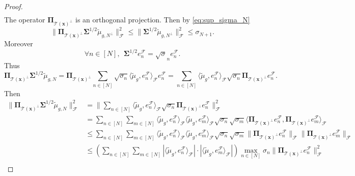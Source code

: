 \documentclass[twoside,11pt]{book}
\numberwithin{theorem}{chapter}
\numberwithin{definition}{chapter}
\numberwithin{proposition}{chapter}
\numberwithin{corollary}{chapter}
\numberwithin{example}{chapter}
\numberwithin{lemma}{chapter}
\numberwithin{assumption}{chapter}
\numberwithin{equation}{chapter}
\numberwithin{figure}{chapter}
\DeclareMathOperator{\F}{\mathcal{F}}
\begin{document}
\begin{proof}
\begin{align}
\end{align}
The operator $\bm{\Pi}_{\mathcal{T}(\bm{x})^{\perp}}$ is an orthogonal projection. Then by \eqref{eq:sup_sigma_N}
%
\begin{equation}
\| \bm{\Pi}_{\mathcal{T}(\bm{x})^{\perp}}\bm{\Sigma}^{1/2} \tilde{\mu}_{g,N^{\perp}}\| _{\mathcal{F}}^{2} \leq \| \bm{\Sigma}^{1/2} \tilde{\mu}_{g,N^{\perp}}\| _{\mathcal{F}}^{2} \leq \sigma_{N+1}.
\end{equation}
Moreover
\begin{equation}
\forall n \in [N], \:\: \bm{\Sigma}^{1/2}e_{n}^{\F} = \sqrt{\sigma}_{n} e_{n}^{\F}.
\end{equation}
 Thus
 \begin{equation}
\bm{\Pi}_{\mathcal{T}(\bm{x})^{\perp}}\bm{\Sigma}^{1/2}\tilde{\mu}_{g,N} = \bm{\Pi}_{\mathcal{T}(\bm{x})^{\perp}}\sum\limits_{n \in [N]} \sqrt{\sigma_{n}} \langle \tilde{\mu}_{g}, e_{n}^{\mathcal{F}} \rangle_{\mathcal{F}} e_{n}^{\mathcal{F}} = \sum\limits_{n \in [N]} \langle \tilde{\mu}_{g}, e_{n}^{\mathcal{F}} \rangle_{\mathcal{F}} \sqrt{\sigma_{n}} \bm{\Pi}_{\mathcal{T}(\bm{x})^{\perp}}e_{n}^{\mathcal{F}}.
\end{equation}
Then
\begin{align}
    \|\bm{\Pi}_{\mathcal{T}(\bm{x})^{\perp}}\bm{\Sigma}^{1/2} \tilde{\mu}_{g,N}\|_{\mathcal{F}}^{2} & = \| \sum\limits_{n \in [N]} \langle \tilde{\mu}_{g}, e_{n}^{\mathcal{F}} \rangle_{\mathcal{F}} \sqrt{\sigma_{n}} \bm{\Pi}_{\mathcal{T}(\bm{x})^{\perp}}e_{n}^{\mathcal{F}} \|_{\mathcal{F}}^{2}\\
    & = \sum\limits_{n \in [N]} \sum\limits_{m \in [N]}\langle \tilde{\mu}_{g}, e_{n}^{\mathcal{F}} \rangle_{\mathcal{F}} \langle \tilde{\mu}_{g}, e_{m}^{\mathcal{F}} \rangle_{\mathcal{F}} \sqrt{\sigma_{n}}\sqrt{\sigma_{m}}  \langle  \bm{\Pi}_{\mathcal{T}(\bm{x})^{\perp}}e_{n}^{\mathcal{F}}, \bm{\Pi}_{\mathcal{T}(\bm{x})^{\perp}}e_{m}^{\mathcal{F}}\rangle_{\mathcal{F}} \nonumber\\
    & \leq \sum\limits_{n \in [N]} \sum\limits_{m \in [N]}\langle \tilde{\mu}_{g}, e_{n}^{\mathcal{F}} \rangle_{\mathcal{F}} \langle \tilde{\mu}_{g}, e_{m}^{\mathcal{F}} \rangle_{\mathcal{F}} \sqrt{\sigma_{n}}\sqrt{\sigma_{m}}   \|\bm{\Pi}_{\mathcal{T}(\bm{x})^{\perp}}e_{n}^{\mathcal{F}}\|_{\mathcal{F}}\|\bm{\Pi}_{\mathcal{T}(\bm{x})^{\perp}}e_{m}^{\mathcal{F}}\|_{\mathcal{F}} \nonumber\\
    & \leq \left( \sum\limits_{n \in [N]} \sum\limits_{m \in [N]} |\langle \tilde{\mu}_{g}, e_{n}^{\mathcal{F}} \rangle_{\mathcal{F}}|\cdot | \langle \tilde{\mu}_{g}, e_{m}^{\mathcal{F}} \rangle_{\mathcal{F}}| \right) \max\limits_{n \in [N]}\sigma_{n}  \|\bm{\Pi}_{\mathcal{T}(\bm{x})^{\perp}}e_{n}^{\mathcal{F}}\|_{\mathcal{F}}^{2} \nonumber\\

\end{align}
\end{proof}
\end{document}

